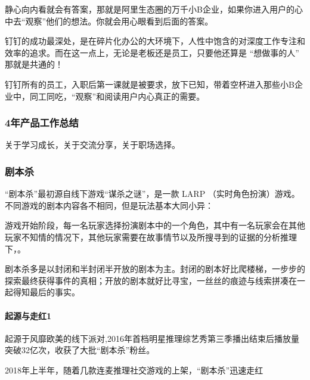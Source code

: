 \documentclass[letterpaper,11pt,english]{sphinxmanual}
\begin{document}
静心向内看就会有答案，那就是阿里生态圈的万千小B企业，如果你进入用户的心中去“观察”他们的想法。你就会用心眼看到后面的答案。

钉钉的成功最深处，是在碎片化办公的大环境下，人性中饱含的对深度工作专注和效率的追求。而在这一点上，无论是老板还是员工，只要他还算是
“想做事的人” 那就是共通的！

钉钉所有的员工，入职后第一课就是被要求，放下已知，带着空杯进入那些小B企业中，同工同吃，“观察”和阅读用户内心真正的需要。


\subsubsection{4年产品工作总结}
\label{\detokenize{chapter_experience/4years:id1}}\label{\detokenize{chapter_experience/4years::doc}}
关于学习成长，关于交流分享，关于职场选择。


\subsubsection{剧本杀}
\label{\detokenize{chapter_experience/jubensha:id1}}\label{\detokenize{chapter_experience/jubensha::doc}}
“剧本杀”最初源自线下游戏“谋杀之谜”，是一款 LARP
（实时角色扮演）游戏。不同游戏的剧本内容各不相同，但是玩法基本大同小异：

游戏开始阶段，每一名玩家选择扮演剧本中的一个角色，其中有一名玩家会在其他玩家不知情的情况下，其他玩家需要在故事情节以及所搜寻到的证据的分析推理下，。

剧本杀多是以封闭和半封闭半开放的剧本为主。封闭的剧本好比爬楼梯，一步步的探索最终获得事件的真相；开放的剧本就好比寻宝，一丝丝的痕迹与线索拼凑在一起得知最后的事实。


\paragraph{起源与走红1\sphinxfootnotemark[214]}
\label{\detokenize{chapter_experience/jubensha:id2}}%
\begin{footnotetext}[214]\sphinxAtStartFootnote
{}
%
\end{footnotetext}\ignorespaces 
起源于风靡欧美的线下派对,2016年首档明星推理综艺秀第三季播出结束后播放量突破32亿次，收获了大批“剧本杀”粉丝。

2018年上半年，随着几款连麦推理社交游戏的上架，“剧本杀”迅速走红
\end{document}
